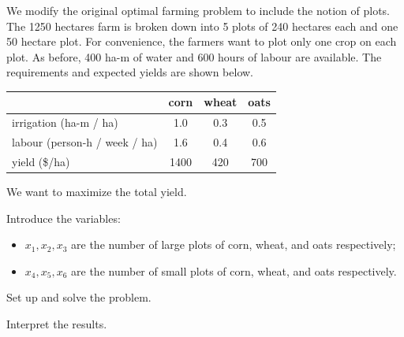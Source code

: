 \documentclass{workbook}
\begin{document}
\begin{slide}
\question

\begin{problem}
We modify the original optimal farming problem to include the notion of plots. The 1250 hectares farm is broken down into 5 plots of 240 hectares each and one 50 hectare plot. For convenience, the farmers want to plot only one crop on each plot. As before, 400 ha-m of water and 600 hours of labour are available. 
The requirements and expected yields are shown below.
	
	\begin{center}
	\small
	\begin{tabular}{l|c|c|c}
	& corn & wheat & oats \\ \hline
	irrigation (ha-m / ha) & 1.0 & 0.3 & 0.5 \\ \hline
	labour (person-h / week / ha) & 1.6 & 0.4 & 0.6 \\ \hline
	yield (\$/ha) & 1400 & 420 & 700 \\ %
	\end{tabular}
	\end{center}
	
	We want to maximize the total yield.
\end{problem}

Introduce the variables:
\begin{itemize}
	\item $x_1, x_2, x_3$ are the number of large plots of corn, wheat, and oats respectively;
	\item $x_4, x_5, x_6$ are the number of small plots of corn, wheat, and oats respectively.
\end{itemize}

\begin{parts}
	\item Set up and solve the problem.
	\item Interpret the results.
\end{parts}

	
\end{slide}
\end{document}
